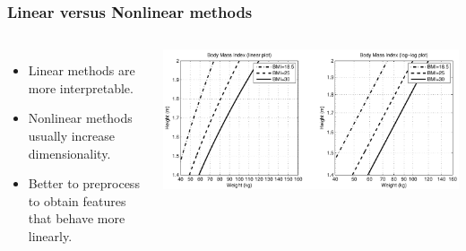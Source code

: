 \documentclass{beamer}
\begin{document}
\begin{frame}
\frametitle{Linear versus Nonlinear methods}
\begin{columns}[c]
\begin{itemize}
\item Linear methods are more interpretable.
\item Nonlinear methods usually increase dimensionality.
\item Better to preprocess to obtain features that behave more linearly.
\end{itemize}
\includegraphics[width=\textwidth]{bmi}

\end{columns}
\end{frame}
\end{document}
